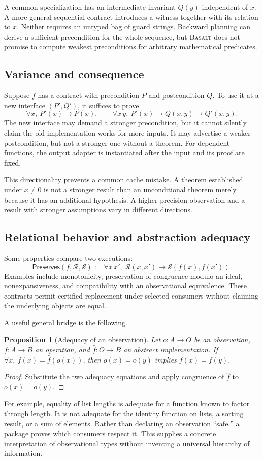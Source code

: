 \documentclass[11pt,a4paper]{article}
\newcommand{\Basalt}{\textsc{Basalt}}
\theoremstyle{plain}
\newtheorem{proposition}{Proposition}[section]
\theoremstyle{definition}
\theoremstyle{remark}
\begin{document}
A common specialization has an intermediate invariant $Q(y)$ independent of
$x$. A more general sequential contract introduces a witness together with
its relation to $x$. Neither requires an untyped bag of guard strings.
Backward planning can derive a sufficient precondition for the whole sequence,
but \Basalt{} does not promise to compute weakest preconditions for arbitrary
mathematical predicates.

\subsection{Variance and consequence}
Suppose $f$ has a contract with precondition $P$ and postcondition $Q$. To use
it at a new interface $(P',Q')$, it suffices to prove
\[
 \forall x,\ P'(x)\to P(x),\qquad
 \forall x\,y,\ P'(x)\to Q(x,y)\to Q'(x,y).
\]
The new interface may demand a stronger precondition, but it cannot silently
claim the old implementation works for more inputs. It may advertise a weaker
postcondition, but not a stronger one without a theorem. For dependent
functions, the output adapter is instantiated after the input and its proof
are fixed.

This directionality prevents a common cache mistake. A theorem established
under $x\ne0$ is not a stronger result than an unconditional theorem merely
because it has an additional hypothesis. A higher-precision observation and a
result with stronger assumptions vary in different directions.

\subsection{Relational behavior and abstraction adequacy}
Some properties compare two executions:
\[
 \mathsf{Preserves}(f,\mathcal R,\mathcal S)
 :=\forall x\,x',\ \mathcal R(x,x')\to\mathcal S(f(x),f(x')).
\]
Examples include monotonicity, preservation of congruence modulo an ideal,
nonexpansiveness, and compatibility with an observational equivalence. These
contracts permit certified replacement under selected consumers without
claiming the underlying objects are equal.

A useful general bridge is the following.
\begin{proposition}[Adequacy of an observation]
Let $o:A\to O$ be an observation, $f:A\to B$ an operation, and
$\widehat f:O\to B$ an abstract implementation. If
$\forall x,\ f(x)=\widehat f(o(x))$, then $o(x)=o(y)$ implies $f(x)=f(y)$.
\end{proposition}
\begin{proof}
Substitute the two adequacy equations and apply congruence of $\widehat f$ to
$o(x)=o(y)$.
\end{proof}
For example, equality of list lengths is adequate for a function known to
factor through length. It is not adequate for the identity function on lists,
a sorting result, or a sum of elements. Rather than declaring an observation
``safe,'' a package proves which consumers respect it. This supplies a
concrete interpretation of observational types without inventing a universal
hierarchy of information.
\end{document}

